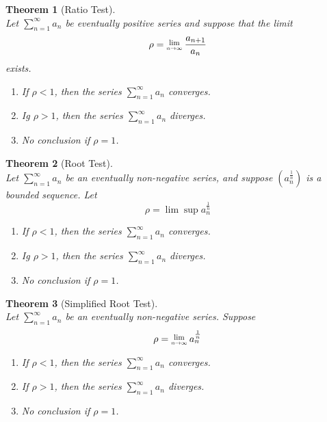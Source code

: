 \documentclass[12pt]{article}
\newcommand{\Lim}[1]{\raisebox{0.5ex}{\scalebox{0.8}{$\displaystyle \lim_{#1}\;$}}}
\newtheorem{theorem}{Theorem}[section]
\theoremstyle{definition}
\begin{document}
\begin{theorem}[Ratio Test]
\hfill\\\normalfont Let $\sum_{n=1}^\infty a_n$ be eventually positive series and suppose that the limit
\[
\rho = \Lim{n\to\infty}\frac{a_{n+1}}{a_n}
\]
exists.
\begin{enumerate}
\item If $\rho<1$, then the series $\sum_{n=1}^\infty a_n$ converges.
\item Ig $\rho>1$, then the series $\sum_{n=1}^\infty a_n$ diverges.
\item No conclusion if $\rho = 1$.
\end{enumerate}
\end{theorem}
\begin{theorem}[Root Test]
\hfill\\\normalfont Let $\sum_{n=1}^\infty a_n$ be an eventually non-negative series, and suppose $(a_n^{\frac{1}{n}})$ is a bounded sequence. Let
\[
\rho = \lim\sup a_n^{\frac{1}{n}}
\]
\begin{enumerate}
\item If $\rho<1$, then the series $\sum_{n=1}^\infty a_n$ converges.
\item Ig $\rho>1$, then the series $\sum_{n=1}^\infty a_n$ diverges.
\item No conclusion if $\rho = 1$.
\end{enumerate}
\end{theorem}
\begin{theorem}[Simplified Root Test]
\hfill\\\normalfont Let $\sum_{n=1}^\infty a_n$ be an eventually non-negative series. Suppose
\[
\rho = \Lim{n\to\infty} a_n^{\frac{1}{n}}
\]
\begin{enumerate}
\item If $\rho<1$, then the series $\sum_{n=1}^\infty a_n$ converges.
\item If $\rho>1$, then the series $\sum_{n=1}^\infty a_n$ diverges.
\item No conclusion if $\rho = 1$.
\end{enumerate}
\end{theorem}
\end{document}
